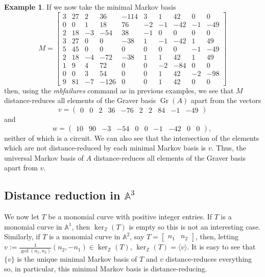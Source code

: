 \documentclass[a4paper, 12pt]{article}
\newcommand{\ZZ}{\mathbb Z}
\theoremstyle{plain}
\theoremstyle{definition}
\newtheorem{example}[theorem]{Example}
\theoremstyle{remark}
\begin{document}
\begin{example}
If we now take the minimal Markov basis 
$$M=\begin{bmatrix}
    3 & 27 & 2 & 36 & -114 & 3 & 1 & 42 & 0 & 0 \\
0 & 0 & 1 & 18 & 76 & -2 & -1 & -42 & -1 & -49 \\
2 & 18 & -3 & -54 & 38 & -1 & 0 & 0 & 0 & 0 \\
3 & 27 & 0 & 0 & -38 & 1 & -1 & -42 & 1 & 49 \\
5 & 45 & 0 & 0 & 0 & 0 & 0 & 0 & -1 & -49 \\
2 & 18 & -4 & -72 & -38 & 1 & 1 & 42 & 1 & 49 \\
1 & 9 & 4 & 72 & 0 & 0 & -2 & -84 & 0 & 0 \\
0 & 0 & 3 & 54 & 0 & 0 & 1 & 42 & -2 & -98 \\
9 & 81 & -7 & -126 & 0 & 0 & 1 & 42 & 0 & 0
\end{bmatrix}$$
then, using the \textit{mbfailures} command as in previous examples, we see that $M$ distance-reduces all elements of the Graver basis $\operatorname{Gr}(A)$ apart from the vectors
$$v=\begin{pmatrix}0&0&2&36&-76&2&2&84&-1&-49\end{pmatrix}$$ and $$w=\begin{pmatrix}10&90&-3&-54&0&0&-1&-42&0&0\end{pmatrix} \text{, }$$
neither of which is a circuit.
We can also see that the intersection of the elements which are not distance-reduced by each minimal Markov basis is $v$. Thus, the universal Markov basis of $A$ distance-reduces all elements of the Graver basis apart from $v$.
\end{example}







\subsection{Distance reduction in $\mathbb{A}^3$}\label{sec: distance reduction A3}

We now let $T$ be a monomial curve with positive integer entries. If $T$ is a monomial curve in $\mathbb{A}^1$, then $\ker_\ZZ(T)$ is empty so this is not an interesting case. Similarly, if $T$ is a monomial curve in $\mathbb{A}^2$, say $T=\begin{bmatrix}n_1 &n_2\end{bmatrix}$, then, letting $v:=\frac{1}{\gcd(n_1,n_2)}(n_2,-n_1) \in \ker_\ZZ(T)$, $\ker_\ZZ(T)=\langle v \rangle$. It is easy to see that $\{v\}$ is the unique minimal Markov basis of $T$ and $v$ distance-reduces everything so, in particular, this minimal Markov basis is distance-reducing.
\end{document}
